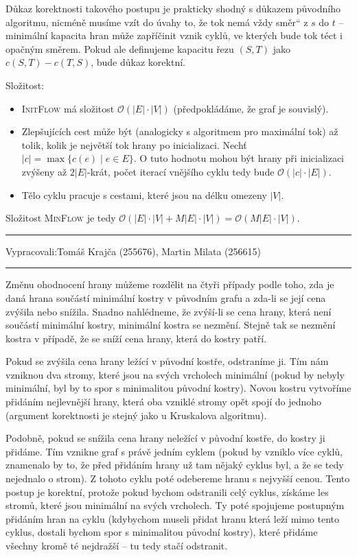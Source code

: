\documentclass[12pt]{article}
\newcommand{\uv}[1]{\quotedblbase #1\textquotedblleft}
\renewcommand{\O}{\mathcal{O}}
\newcommand{\zadani}[2]{
{\large
\noindent {\bf IB108 \hfill{} Sada #1, Příklad #2 \\[-4mm]}
\noindent\hrule
\vspace{2mm}
\noindent Vypracovali:\hfill{}Tomáš Krajča (255676), Martin Milata (256615)
\vspace{3mm}
\hrule
\bigskip\bigskip}
}
\begin{document}
Důkaz korektnosti takového postupu je prakticky shodný s důkazem původního algoritmu, nicméně musíme
vzít do úvahy to, že tok nemá vždy \uv{směr} z $s$ do $t$ -- minimální kapacita hran může zapříčinit
vznik cyklů, ve kterých bude tok téct i opačným směrem. Pokud ale definujeme kapacitu řezu
$(S,T)$ jako $c(S,T) - c(T,S)$, bude důkaz korektní.

\noindent
Složitost:
\begin{itemize}
\item \textsc{InitFlow} má složitost $\O(|E|\cdot|V|)$ (předpokládáme, že graf je souvislý).
\item Zlepšujících cest může být (analogicky s algoritmem pro maximální tok) až tolik, kolik je
největší tok hrany po inicializaci.  Nechť $|c| = \max\{c(e) \mid e \in E\}$. O tuto hodnotu mohou být
hrany při inicializaci zvýšeny až $2|E|$-krát, počet iterací vnějšího cyklu tedy bude $\O(|c|\cdot|E|)$.
\item Tělo cyklu pracuje s cestami, které jsou na délku omezeny $|V|$.
\end{itemize}
Složitost \textsc{MinFlow} je tedy $\O(|E|\cdot|V| + M|E|\cdot|V|) = \O(M|E|\cdot|V|)$.



\clearpage
\zadani{3}{4}

\noindent
Změnu ohodnocení hrany můžeme rozdělit na čtyři případy podle toho, zda je daná hrana součástí
minimální kostry v původním grafu a zda-li se její cena zvýšila nebo snížila.  Snadno nahlédneme, že
zvýší-li se cena hrany, která není součástí minimální kostry, minimální kostra se nezmění. Stejně
tak se nezmění kostra v případě, že se sníží cena hrany, která do kostry patří.

Pokud se zvýšila cena hrany ležící v původní kostře, odstraníme ji. Tím nám vzniknou dva stromy,
které jsou na svých vrcholech minimální
(pokud by nebyly minimální, byl by to spor s minimalitou původní kostry). Novou kostru
vytvoříme přidáním nejlevnější hrany, která oba vzniklé stromy opět spojí do jednoho (argument
korektnosti je stejný jako u Kruskalova algoritmu).

Podobně, pokud se snížila cena hrany neležící v původní kostře, do kostry ji přidáme. Tím vznikne graf
s právě jedním cyklem (pokud by vzniklo více cyklů, znamenalo by to, že před přidáním hrany už tam nějaký
cyklus byl, a že se tedy nejednalo o strom). Z tohoto cyklu poté odebereme hranu s nejvyšší cenou. Tento
postup je korektní, protože pokud bychom odstranili celý cyklus, získáme les stromů, které jsou
minimální na svých vrcholech.
Ty poté spojujeme postupným přidáním hran na cyklu (kdybychom museli přidat hranu která leží mimo
tento cyklus, dostali bychom spor s minimalitou původní kostry), které přidáme všechny kromě té nejdražší
-- tu tedy stačí odstranit.
\end{document}
